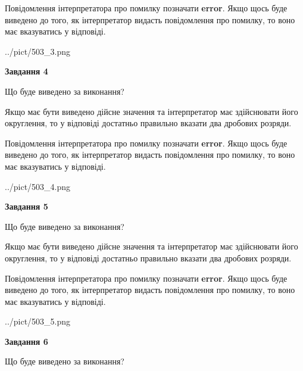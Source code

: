 \documentclass[12pt, ukrainian]{article}
\begin{document}
{\begin {Large}
Повідомлення інтерпретатора про помилку позначати \textbf{error}.
Якщо щось буде виведено до того, як інтерпретатор видасть повідомлення про помилку, 
то воно має вказуватись у відповіді. \par

\begin{center}
	{../pict/503_3.png}
\end{center}
\newpage

{\begin {center}\textbf{Завдання 4}\end {center}}\par
Що буде виведено за виконання? \par

Якщо має бути виведено дійсне значення та інтерпретатор має здійснювати його округлення, 
то у відповіді достатньо правильно вказати два дробових розряди.

Повідомлення інтерпретатора про помилку позначати \textbf{error}.
Якщо щось буде виведено до того, як інтерпретатор видасть повідомлення про помилку, 
то воно має вказуватись у відповіді. \par

\begin{center}
	{../pict/503_4.png}
\end{center}
\newpage

{\begin {center}\textbf{Завдання 5}\end {center}}\par
Що буде виведено за виконання? \par

Якщо має бути виведено дійсне значення та інтерпретатор має здійснювати його округлення, 
то у відповіді достатньо правильно вказати два дробових розряди.

Повідомлення інтерпретатора про помилку позначати \textbf{error}.
Якщо щось буде виведено до того, як інтерпретатор видасть повідомлення про помилку, 
то воно має вказуватись у відповіді. \par

\begin{center}
	{../pict/503_5.png}
\end{center}
\newpage

{\begin {center}\textbf{Завдання 6}\end {center}}\par
Що буде виведено за виконання? \par


\end{Large}}
\end{document}
